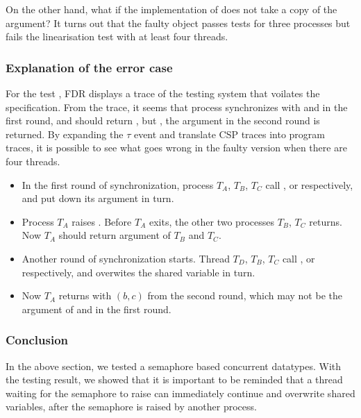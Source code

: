 \documentclass{article}
\begin{document}
On the other hand, what if the implementation of  does not take a copy of the argument? It turns out that the faulty  object passes tests for three processes but fails the linearisation test with at least four threads.


\subsubsection{Explanation of the error case}
For the test \CSPM{Spec4Thread [T= System4}, FDR displays a trace of the testing system that voilates the specification. From the trace, it seems that process  synchronizes with  and  in the first round, and should return , but , the argument in the second round is returned. By expanding the $\tau$ event and translate CSP traces into program traces, it is possible to see what goes wrong in the faulty version when there are four threads.


\begin{itemize}
  \item In the first round of synchronization, process $T_A$, $T_B$, $T_C$ call ,  or  respectively, and put down its argument in turn.
  \item Process $T_A$ raises . Before $T_A$ exits, the other two processes $T_B$, $T_C$ returns. Now $T_A$ should return argument of $T_B$ and $T_C$.
  \item Another round of synchronization starts. Thread $T_D$, $T_B$, $T_C$ call ,  or  respectively, and overwites the shared variable  in turn.
  \item Now $T_A$ returns with $(b,c)$ from the second round, which may not be the argument of  and  in the first round.
\end{itemize}

\subsubsection{Conclusion}
In the above section, we tested a semaphore based concurrent datatypes. With the testing result, we showed that it is important to be reminded that a thread waiting for the semaphore to raise can immediately continue and overwrite shared variables, after the semaphore is raised by another process.
\end{document}
